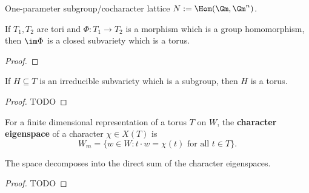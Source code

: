 \begin{definition}
  \label{1-1-cochar-lat}

  One-parameter subgroup/cocharacter lattice $N := \Hom(\Gm, \Gm^n)$.
\end{definition}


\begin{proposition}[Proposition 1.1.1(a)]
  \label{1-1-1-group-hom-subtorus}

  If $T_1, T_2$ are tori and $\Phi : T_1 \to T_2$ is a morphism which is a group homomorphism, then $\im \Phi$ is a closed subvariety which is a torus.
\end{proposition}
\begin{proof}


\end{proof}


\begin{proposition}
  \label{1-1-1-subgroup-subtorus}

  If $H \subseteq T$ is an irreducible subvariety which is a subgroup, then $H$ is a torus.
\end{proposition}
\begin{proof}

  TODO
\end{proof}


\begin{definition}
  \label{1-1-char-eigenspace}

  For a finite dimensional representation of a torus $T$ on $W$, the {\bf character eigenspace} of a character $\chi \in X(T)$ is
  \[
    W_m = \{w\in W : t\cdot w = \chi(t)\text{ for all } t\in T \}.
  \]
\end{definition}


\begin{proposition}
  \label{1-1-2-char-eigenspace-direct-sum}

  The space decomposes into the direct sum of the character eigenspaces.
\end{proposition}
\begin{proof}
  \uses{}

  TODO
\end{proof}



